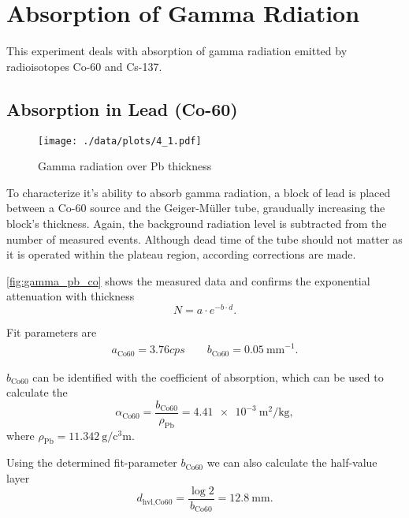 \chapter{Absorption of Gamma Rdiation}
This experiment deals with absorption of gamma radiation emitted by radioisotopes Co-60 and Cs-137.

\section{Absorption in Lead (Co-60)}\label{sec:co}
\begin{figure}[ht!]
	\centering
	\texttt{[image: ./data/plots/4\_1.pdf]}
	\caption[Gamma radiation over Pb thickness]{Gamma radiation over Pb thickness}
	\label{fig:gamma_pb_co}
\end{figure}
To characterize it's ability to absorb gamma radiation, a block of lead is placed between a Co-60 source and the Geiger-Müller tube, graudually increasing the block's thickness.
Again, the background radiation level is subtracted from the number of measured events.
Although dead time of the tube should not matter as it is operated within the plateau region, according corrections are made.

\autoref{fig:gamma_pb_co} shows the measured data and confirms the exponential attenuation with thickness
\begin{equation*}
	N = a \cdot e^{-b \cdot d}.
\end{equation*}

Fit parameters are
\begin{gather*}
	a_\text{Co60}=\num{3.76}cps\qquad b_\text{Co60}=\SI{0.05}{\milli\meter}^{-1}.
\end{gather*}

$b_\text{Co60}$ can be identified with the coefficient of absorption, which can be used to calculate the 
\begin{equation*}
	\alpha_\text{Co60}=\frac{b_\text{Co60}}{\rho_\text{Pb}}=\SI{4.41e-3}{\meter\squared\per\kilogram},
\end{equation*}
where $\rho_\text{Pb}=\SI{11.342}{\gram\per\cubic\centi\meter}$.

Using the determined fit-parameter $b_\text{Co60}$ we can also calculate the half-value layer
\begin{equation*}
	d_\text{hvl,Co60}=\frac{\log{2}}{b_\text{Co60}}=\SI{12.8}{\milli\meter}.
\end{equation*}

